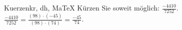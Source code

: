 \begin{MAufgabe}{Kuerzen}{kr, dh, MaTeX}
K\"urzen Sie soweit m\"oglich: $\frac{-4410}{7252}$.\\ 
\ifLsg\MLoesung
\quad $\frac{-4410}{7252}=\frac{(98)\cdot(-45)}{(98)\cdot(74)}=\frac{-45}{74}$.\else\relax\fi
 \end{MAufgabe}
